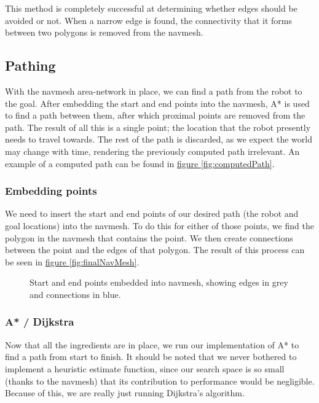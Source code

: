 \documentclass[10pt, abstracton, twocolumn]{scrartcl}
\newcommand{\fref}[1]{\hyperref[#1]{figure \vref{#1}}}
\begin{document}
This method is completely successful at determining whether edges should be avoided or not. When a narrow edge is found, the connectivity that it forms between two polygons is removed from the navmesh.

\subsection{Pathing}
With the navmesh area-network in place, we can find a path from the robot to the goal. After embedding the start and end points into the navmesh, A* is used to find a path between them, after which proximal points are removed from the path. The result of all this is a single point; the location that the robot presently needs to travel towards. The rest of the path is discarded, as we expect the world may change with time, rendering the previously computed path irrelevant. An example of a computed path can be found in \fref{fig:computedPath}.

\subsubsection{Embedding points}
We need to insert the start and end points of our desired path (the robot and goal locations) into the navmesh. To do this for either of those points, we find the polygon in the navmesh that contains the point. We then create connections between the point and the edges of that polygon. The result of this process can be seen in \fref{fig:finalNavMesh}.

\begin{figure}[h]
        \centering
        
        \caption{\small Start and end points embedded into navmesh, showing edges in grey and connections in blue.}
        \label{fig:finalNavMesh}
\end{figure}

\subsubsection{A* / Dijkstra}

Now that all the ingredients are in place, we run our implementation of A* to find a path from start to finish. It should be noted that we never bothered to implement a heuristic estimate function, since our search space is so small (thanks to the navmesh) that its contribution to performance would be negligible. Because of this, we are really just running Dijkstra's algorithm.
\end{document}
